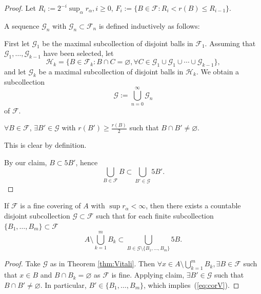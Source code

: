 \begin{proof}
    Let $R_{i}:=2^{-i}\sup_{\alpha}r_{\alpha},i\geq 0$, $F_{i}:=\{ B \in \mathscr{F}:R_{i}<r(B)\leq R_{i-1} \}$. 

    A sequence $\mathscr{G}_{n}$ with $\mathscr{G}_{n} \subset \mathscr{F}_{n}$ is defined inductively as follows:

    First let $\mathscr{G}_{1}$ be the maximal subcollection of disjoint balls in $\mathscr{F}_{1}$. Assuming that $\mathscr{G}_{1}, \ldots ,\mathscr{G}_{k-1}$ have been selected, let
    $$
    \mathscr{H}_{k}=\{ B \in \mathscr{F}_{k}: B\cap C=\varnothing ,\forall C \in \mathscr{G}_{1}\cup \mathscr{G}_{1}\cup \cdots\cup \mathscr{G}_{k-1} \},
    $$
    and let $\mathscr{G}_{k}$ be a maximal subcollection of disjoint balls in $\mathscr{H}_{k}$. We obtain a subcollection
    $$
    \mathscr{G}:=\bigcup_{n=0} ^{\infty} \mathscr{G}_{n}
    $$
    of $\mathscr{F}$.

    \begin{claim}
        $\forall B\in \mathscr{F}$, $\exists B' \in \mathscr{G}$ with $r(B')\geq \frac{r(B)}{2}$ such that $B\cap B'\neq \varnothing.$
    \end{claim}
	
	This is clear by definition.

    By our claim, $B \subset 5B'$, hence
    $$
    \bigcup _{B \in \mathscr{F}}B \subset \bigcup _{B' \in \mathscr{G}}5B'.
    $$
\end{proof}

\begin{corollary}\label{cor:Vitali-fine}
If $\mathscr{F}$ is a fine covering of $A$ with $\sup r_{\alpha}<\infty$, then there exists a countable disjoint subcollection $\mathscr{G}\subset\mathscr{F}$ such that for each finite subcollection $\{B_{1},\dots,B_{m}\}\subset\mathscr{F}$
\begin{equation}\label{eq:corV}
A\setminus \bigcup_{k=1}^{m}B_{k}\subset \bigcup_{B\in\mathscr{G}\setminus\{B_{1},\dots,B_{m}\}}5B.
\end{equation}
\end{corollary}

\begin{proof}
    Take $\mathscr{G}$ as in Theorem \ref{thm:Vitali}. Then $\forall x \in A\setminus \bigcup _{k=1}^{m}B_{k}, \exists B\in \mathscr{F}$ such that $x \in B$ and $B\cap B_{k}=\varnothing$ as $\mathscr{F}$ is fine. Applying claim, $\exists B' \in \mathscr{G}$ such that $B\cap B'\neq \varnothing$. In particular, $B'\in \{ B_1, \ldots ,B_{m} \}$, which implies~(\ref{eq:corV}).
\end{proof}

